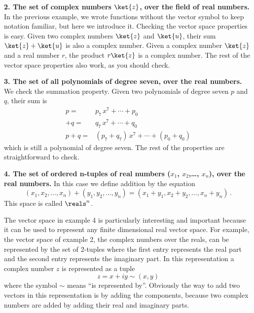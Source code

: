 \noindent \textbf{2. The set of complex numbers $\ket{z}$, over the field of real numbers.}
In the previous example, we wrote functions without the vector symbol to keep notation familiar, but here we introduce it.
Checking the vector space properties is easy.
Given two complex numbers $\ket{z}$ and $\ket{u}$, their sum $\ket{z} + \ket{u}$ is also a complex number.
Given a complex number $\ket{z}$ and a real number $r$, the product $r\ket{z}$ is a complex number.
The rest of the vector space properties also work, as you should check.\newline

\noindent \textbf{3. The set of all polynomials of degree seven, over the real numbers.}
We check the summation property.
Given two polynomials of degree seven $p$ and $q$, their sum is
\begin{equation*}
  \begin{split}
    p =& p_7\,x^7 + \cdots + p_0 \\
   +q =& q_7\,x^7 + \cdots + q_0 \\
    \hline
   p + q =& (p_7 + q_7) \, x^7 + \cdots + (p_0 + q_0)
  \end{split}
\end{equation*}
which is still a polynomial of degree seven.
The rest of the properties are straightforward to check.\newline

\noindent \textbf{4. The set of ordered n-tuples of real numbers ($x_1$, $x_2$,\ldots , $x_n$), over the real numbers.}
In this case we define addition by the equation
\begin{equation*}
  (x_1, x_2, \ldots, x_n) + (y_1, y_2, \ldots, y_n) = (x_1 + y_1, x_2 + y_2, \ldots, x_n + y_n) \, .
\end{equation*}
This space is called $\reals^n$.

The vector space in example 4 is particularly interesting and important because it can be used to represent any finite dimensional real vector space.
For example, the vector space of example 2, the complex numbers over the reals, can be represented by the set of 2-tuples where the first entry represents the real part and the second entry represents the imaginary part.
In this representation a complex number $z$ is represented as a tuple
\begin{equation*}
  z = x + iy \sim (x,y)
\end{equation*}
where the symbol $\sim$ means ``is represented by''.
Obviously the way to add two vectors in this representation is by adding the components, because two complex numbers are added by adding their real and imaginary parts.


